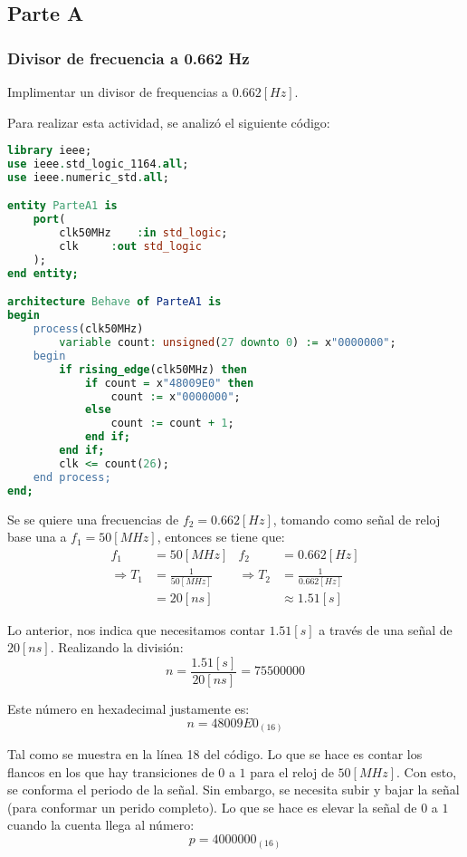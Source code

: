 \documentclass[../procedimientos.tex]{subfiles}
\begin{document}
\clearpage
\subsection{Parte A}
\subsubsection{Divisor de frecuencia a 0.662 Hz}
\begin{em}
  Implimentar un divisor de frequencias a $0.662 [Hz]$.
\end{em}

Para realizar esta actividad, se analizó el siguiente código:
\begin{lstlisting}[language=vhdl]
library ieee;
use ieee.std_logic_1164.all;
use ieee.numeric_std.all;

entity ParteA1 is
	port(
		clk50MHz	:in std_logic;
		clk		:out std_logic
	);
end entity;

architecture Behave of ParteA1 is
begin
	process(clk50MHz)
		variable count: unsigned(27 downto 0) := x"0000000";
	begin
		if rising_edge(clk50MHz) then
			if count = x"48009E0" then
				count := x"0000000";
			else
				count := count + 1;
			end if;
		end if;
		clk <= count(26);
	end process;
end;
\end{lstlisting}

Se se quiere una frecuencias de $f_2 = 0.662 [Hz]$, tomando como señal de 
reloj base una a $f_1 = 50 [MHz]$, entonces se tiene que:
\begin{align*}
  f_1 &= 50 [MHz] & f_2 &= 0.662 [Hz]\\
  \Rightarrow T_1 &= \frac{1}{50 [MHz]} & \Rightarrow T_2 &= \frac{1}{0.662 
  [Hz]}\\
  &= 20 [ns] & &\approx 1.51 [s]
\end{align*}

Lo anterior, nos indica que necesitamos contar $1.51 [s]$ a través de una 
señal de $20 [ns]$. Realizando la división:
\[n = \frac{1.51 [s]}{20 [ns]} = 75500000\]

Este número en hexadecimal justamente es:
\[n = 48009E0_{(16)}\]

Tal como se muestra en la línea 18 del código. Lo que se hace es contar los 
flancos en los que hay transiciones de $0$ a $1$ para el reloj de $50 [MHz]$.  
Con esto, se conforma el periodo de la señal. Sin embargo, se necesita subir y 
bajar la señal (para conformar un perido completo). Lo que se hace es elevar 
la señal de $0$ a $1$ cuando la cuenta llega al número:
\[p = 4000000_{(16)}\]
\end{document}
